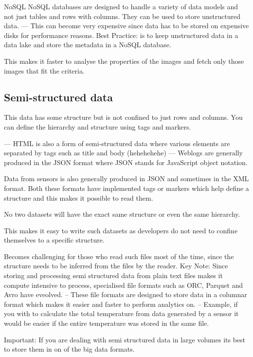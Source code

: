 \documentclass[a4paper, 11pt]{article}
\begin{document}
    NoSQL
    NoSQL databases are designed to handle a variety of data models and not just tables and rows with columns.
    They can be used to store unstructured data.
    --- This can become very expensive since data has to be stored on expensive disks for performance reasons.
    Best Practice: is to keep unstructured data in a data lake and store the metadata in a NoSQL database.

    This makes it faster to analyse the properties of the images and fetch only those images that fit the criteria.

    \subsection{Semi-structured data}
    This data has some structure but is not confined to just rows and columns.
    You can define the hierarchy and structure using tags and markers.

    --- HTML is also a form of semi-structured data where various elements are separated by tags such as title and body (hehehehehe)
    --- Weblogs are generally produced in the JSON format where JSON stands for JavaScript object notation.

    Data from sensors is also generally produced in JSON and sometimes in the XML format.
    Both these formats have implemented tags or markers which help define a structure and this makes it possible to read them.

    No two datasets will have the exact same structure or even the same hierarchy.

    This makes it easy to write such datasets as developers do not need to confine themselves to a specific structure.

    Becomes challenging for those who read such files most of the time, since the structure needs to be inferred from the files by the reader.
    Key Note: Since storing and processing semi structured data from plain text files makes it compute intensive to process, specialised file formats such as ORC, Parquet and Avro have eveolved.
    -- These file formats are designed to store data in a columnar format which makes it easier and faster to perform analytics on.
    -- Example, if you with to calculate the total temperature from data generated by a sensor it would be easier if the entire temperature was stored in the same file.

    Important: If you are dealing with semi structured data in large volumes its best to store them in on of the big data formats.
\end{document}
